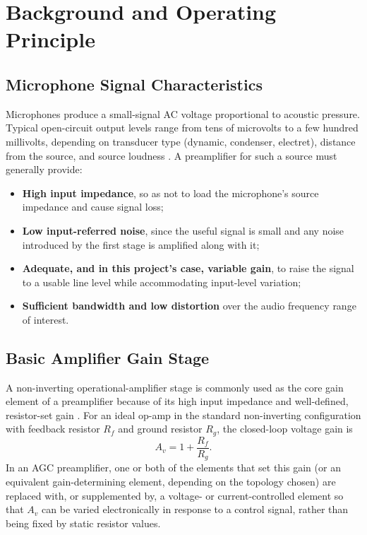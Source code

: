 \chapter{Background and Operating Principle}
\label{ch:theory}

\section{Microphone Signal Characteristics}

Microphones produce a small-signal AC voltage proportional to acoustic pressure. Typical open-circuit output levels range from tens of microvolts to a few hundred millivolts, depending on transducer type (dynamic, condenser, electret), distance from the source, and source loudness \cite{ref1,ref2}. A preamplifier for such a source must generally provide:
\begin{itemize}
    \item \textbf{High input impedance}, so as not to load the microphone's source impedance and cause signal loss;
    \item \textbf{Low input-referred noise}, since the useful signal is small and any noise introduced by the first stage is amplified along with it;
    \item \textbf{Adequate, and in this project's case, variable gain}, to raise the signal to a usable line level while accommodating input-level variation;
    \item \textbf{Sufficient bandwidth and low distortion} over the audio frequency range of interest.
\end{itemize}

\section{Basic Amplifier Gain Stage}

A non-inverting operational-amplifier stage is commonly used as the core gain element of a preamplifier because of its high input impedance and well-defined, resistor-set gain \cite{ref2,ref4}. For an ideal op-amp in the standard non-inverting configuration with feedback resistor $R_f$ and ground resistor $R_g$, the closed-loop voltage gain is
\begin{equation}
    A_v = 1 + \frac{R_f}{R_g}.
    \label{eq:noninverting_gain}
\end{equation}
In an AGC preamplifier, one or both of the elements that set this gain (or an equivalent gain-determining element, depending on the topology chosen) are replaced with, or supplemented by, a voltage- or current-controlled element so that $A_v$ can be varied electronically in response to a control signal, rather than being fixed by static resistor values.

